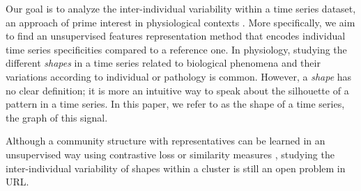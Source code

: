  Our goal is to analyze the inter-individual variability within a time series dataset, an approach of prime interest in physiological contexts \cite{guscelli2019importance,wang2016research,bar2012studying,germain2023unsupervised}.
  More specifically, we aim to find an unsupervised features representation method that encodes individual time series specificities compared to a reference one.
In physiology, studying the different \textit{shapes} in a time series related to biological phenomena and their variations according to individual or pathology is common.
However, a \textit{shape} has no clear definition; it is more an intuitive way to speak about the silhouette of a pattern in a time series. In this paper, we refer to as the shape of a time series, the graph of this signal.

Although a community structure with representatives can be learned in an unsupervised way \cite{trirat2024universal,meng2023unsupervised} using contrastive loss \cite{franceschi2019unsupervised,tonekaboni2021unsupervised,meng2023unsupervised} or similarity measures \cite{asgari2023clustering,germain2023unsupervised,paparrizos2015k,ye2009time},
studying the inter-individual variability of shapes within a cluster \cite{niennattrakul2007inaccuracies,shirato2023identifying} is still an open problem in URL.

